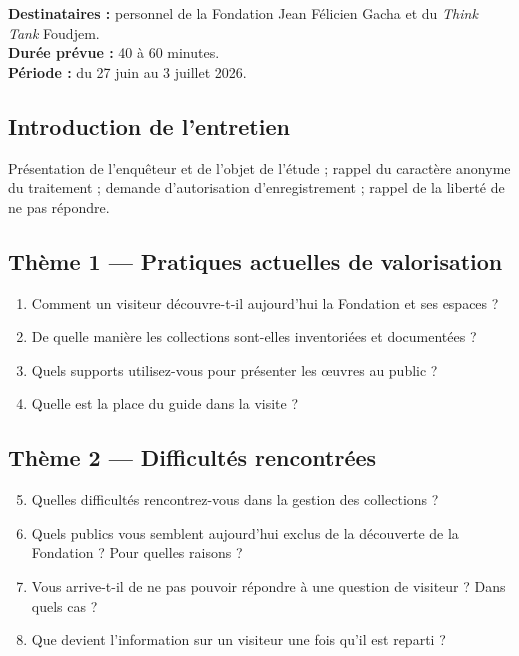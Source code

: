 \textbf{Destinataires :} personnel de la Fondation Jean Félicien Gacha et du
\emph{Think Tank} Foudjem.\\
\textbf{Durée prévue :} 40 à 60 minutes.\\
\textbf{Période :} du 27 juin au 3 juillet 2026.

\subsection*{Introduction de l'entretien}

Présentation de l'enquêteur et de l'objet de l'étude ; rappel du caractère
anonyme du traitement ; demande d'autorisation d'enregistrement ; rappel de la
liberté de ne pas répondre.

\subsection*{Thème 1 — Pratiques actuelles de valorisation}

\begin{enumerate}
  \item Comment un visiteur découvre-t-il aujourd'hui la Fondation et ses
        espaces ?
  \item De quelle manière les collections sont-elles inventoriées et
        documentées ?
  \item Quels supports utilisez-vous pour présenter les œuvres au public ?
  \item Quelle est la place du guide dans la visite ?
\end{enumerate}

\subsection*{Thème 2 — Difficultés rencontrées}

\begin{enumerate}\setcounter{enumi}{4}
  \item Quelles difficultés rencontrez-vous dans la gestion des collections ?
  \item Quels publics vous semblent aujourd'hui exclus de la découverte de la
        Fondation ? Pour quelles raisons ?
  \item Vous arrive-t-il de ne pas pouvoir répondre à une question de visiteur ?
        Dans quels cas ?
  \item Que devient l'information sur un visiteur une fois qu'il est reparti ?
\end{enumerate}

